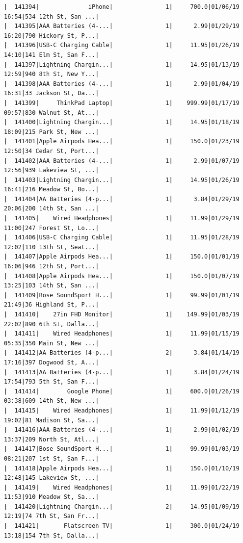 \documentclass[
  letterpaper,
  DIV=11,
  numbers=noendperiod]{scrartcl}
\begin{document}
\begin{verbatim}
|  141394|              iPhone|               1|     700.0|01/06/19 16:54|534 12th St, San ...|
|  141395|AAA Batteries (4-...|               1|      2.99|01/29/19 16:20|790 Hickory St, P...|
|  141396|USB-C Charging Cable|               1|     11.95|01/26/19 14:10|141 Elm St, San F...|
|  141397|Lightning Chargin...|               1|     14.95|01/13/19 12:59|940 8th St, New Y...|
|  141398|AAA Batteries (4-...|               1|      2.99|01/04/19 16:31|33 Jackson St, Da...|
|  141399|     ThinkPad Laptop|               1|    999.99|01/17/19 09:57|830 Walnut St, At...|
|  141400|Lightning Chargin...|               1|     14.95|01/18/19 18:09|215 Park St, New ...|
|  141401|Apple Airpods Hea...|               1|     150.0|01/23/19 12:50|34 Cedar St, Port...|
|  141402|AAA Batteries (4-...|               1|      2.99|01/07/19 12:56|939 Lakeview St, ...|
|  141403|Lightning Chargin...|               1|     14.95|01/26/19 16:41|216 Meadow St, Bo...|
|  141404|AA Batteries (4-p...|               1|      3.84|01/29/19 20:06|200 14th St, San ...|
|  141405|    Wired Headphones|               1|     11.99|01/29/19 11:00|247 Forest St, Lo...|
|  141406|USB-C Charging Cable|               1|     11.95|01/28/19 12:02|110 13th St, Seat...|
|  141407|Apple Airpods Hea...|               1|     150.0|01/01/19 16:06|946 12th St, Port...|
|  141408|Apple Airpods Hea...|               1|     150.0|01/07/19 13:25|103 14th St, San ...|
|  141409|Bose SoundSport H...|               1|     99.99|01/01/19 21:49|36 Highland St, P...|
|  141410|    27in FHD Monitor|               1|    149.99|01/03/19 22:02|890 6th St, Dalla...|
|  141411|    Wired Headphones|               1|     11.99|01/15/19 05:35|350 Main St, New ...|
|  141412|AA Batteries (4-p...|               2|      3.84|01/14/19 17:16|397 Dogwood St, A...|
|  141413|AA Batteries (4-p...|               1|      3.84|01/24/19 17:54|793 5th St, San F...|
|  141414|        Google Phone|               1|     600.0|01/26/19 03:38|609 14th St, New ...|
|  141415|    Wired Headphones|               1|     11.99|01/12/19 19:02|81 Madison St, Sa...|
|  141416|AAA Batteries (4-...|               1|      2.99|01/02/19 13:37|209 North St, Atl...|
|  141417|Bose SoundSport H...|               1|     99.99|01/03/19 08:21|207 1st St, San F...|
|  141418|Apple Airpods Hea...|               1|     150.0|01/10/19 12:48|145 Lakeview St, ...|
|  141419|    Wired Headphones|               1|     11.99|01/22/19 11:53|910 Meadow St, Sa...|
|  141420|Lightning Chargin...|               2|     14.95|01/09/19 12:19|74 7th St, San Fr...|
|  141421|       Flatscreen TV|               1|     300.0|01/24/19 13:18|154 7th St, Dalla...|

\end{verbatim}
\end{document}

